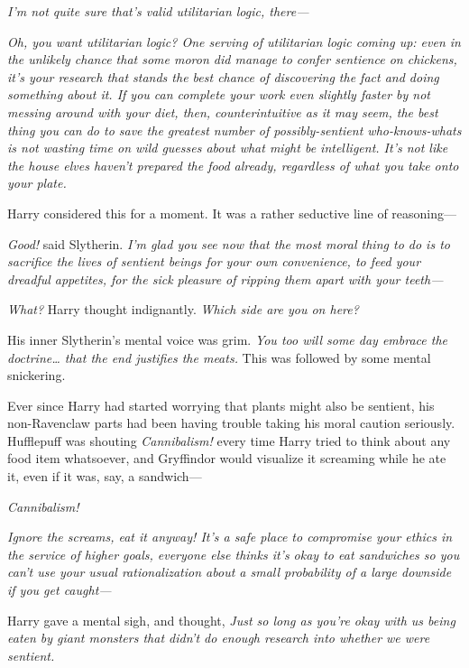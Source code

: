 \emph{I'm not quite sure that's valid utilitarian logic, there—}

\emph{Oh, you want utilitarian logic? One serving of utilitarian logic coming up: even in the unlikely chance that some moron \emph{did} manage to confer sentience on chickens, it's \emph{your} research that stands the best chance of discovering the fact and doing something about it. If you can complete your work even slightly faster by \emph{not} messing around with your diet, then, counterintuitive as it may seem, the \emph{best} thing you can do to save the greatest number of possibly-sentient who-knows-whats is \emph{not} wasting time on wild guesses about what might be intelligent. It's not like the house elves haven't prepared the food already, regardless of what you take onto your plate.}

Harry considered this for a moment. It was a rather seductive line of reasoning—

\emph{Good!} said Slytherin. \emph{I'm glad you see now that the most moral thing to do is to sacrifice the lives of sentient beings for your own convenience, to feed your dreadful appetites, for the sick pleasure of ripping them apart with your teeth—}

\emph{What?} Harry thought indignantly. \emph{Which side are you \emph{on} here?}

His inner Slytherin's mental voice was grim. \emph{You too will some day embrace the doctrine{\ldots} that the end justifies the meats.} This was followed by some mental snickering.

Ever since Harry had started worrying that plants might also be sentient, his non-Ravenclaw parts had been having trouble taking his moral caution seriously. Hufflepuff was shouting \emph{Cannibalism!} every time Harry tried to think about any food item whatsoever, and Gryffindor would visualize it screaming while he ate it, even if it was, say, a sandwich—

\emph{Cannibalism!}

\emph{}

\emph{Ignore the screams, eat it anyway! It's a safe place to compromise your ethics in the service of higher goals, everyone \emph{else} thinks it's okay to eat sandwiches so you can't use your usual rationalization about a small probability of a large downside if you get caught—}

Harry gave a mental sigh, and thought, \emph{Just so long as you're okay with \emph{us} being eaten by giant monsters that didn't do enough research into whether \emph{we} were sentient.}

